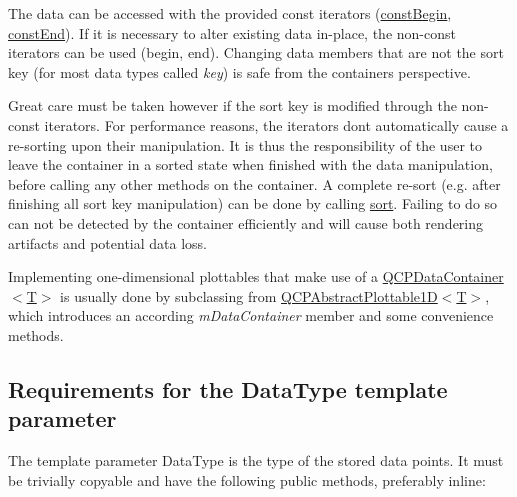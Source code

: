 The data can be accessed with the provided const iterators (\hyperlink{class_q_c_p_data_container_a49d7622999e2de67fa2331626a3159aa}{const\+Begin}, \hyperlink{class_q_c_p_data_container_aa7f7cf239b85b1a28de3d675cc5b3da1}{const\+End}). If it is necessary to alter existing data in-\/place, the non-\/const iterators can be used (begin, end). Changing data members that are not the sort key (for most data types called {\itshape key}) is safe from the container\textquotesingle{}s perspective.

Great care must be taken however if the sort key is modified through the non-\/const iterators. For performance reasons, the iterators don\textquotesingle{}t automatically cause a re-\/sorting upon their manipulation. It is thus the responsibility of the user to leave the container in a sorted state when finished with the data manipulation, before calling any other methods on the container. A complete re-\/sort (e.\+g. after finishing all sort key manipulation) can be done by calling \hyperlink{class_q_c_p_data_container_a75da92e33063b63d6da5014683591d45}{sort}. Failing to do so can not be detected by the container efficiently and will cause both rendering artifacts and potential data loss.

Implementing one-\/dimensional plottables that make use of a \hyperlink{class_q_c_p_data_container}{Q\+C\+P\+Data\+Container$<$\+T$>$} is usually done by subclassing from \hyperlink{class_q_c_p_abstract_plottable1_d}{Q\+C\+P\+Abstract\+Plottable1D$<$T$>$}, which introduces an according {\itshape m\+Data\+Container} member and some convenience methods.\hypertarget{class_q_c_p_data_container_qcpdatacontainer-datatype}{}\subsection{Requirements for the Data\+Type template parameter}\label{class_q_c_p_data_container_qcpdatacontainer-datatype}
The template parameter {\ttfamily Data\+Type} is the type of the stored data points. It must be trivially copyable and have the following public methods, preferably inline\+:

